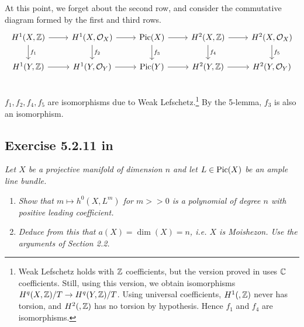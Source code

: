 \documentclass{article}
\begin{document}
At this point, we forget about the second row, and consider the commutative diagram formed by the first and third rows.
\[
\begin{tikzcd}
H^1(X,\Z)\arrow{r}\arrow{d}{f_1} & H^1(X,\mathcal{O}_X)\arrow{r}\arrow{d}{f_2} & \Pic(X) \arrow{r}\arrow{d}{f_3} & 
H^2(X,\Z)\arrow{r}\arrow{d}{f_4} & H^2(X,\mathcal{O}_X)\arrow{d}{f_5} \\
H^1(Y,\Z)\arrow{r} & H^1(Y,\mathcal{O}_Y)\arrow{r} & \Pic(Y) \arrow{r} & H^2(Y,\Z)\arrow{r} & H^2(Y,\mathcal{O}_Y) \\
\end{tikzcd}
\]
$f_1, f_2, f_4, f_5$ are isomorphisms due to Weak Lefschetz.\footnote{Weak Lefschetz holds with $\mathbb{Z}$ coefficients, but
the version proved in \cite{Huy} uses $\mathbb{C}$ coefficients. Still, using this version, we obtain isomorphisms
$H^q(X,\mathbb{Z})/T \to H^q(Y,\mathbb{Z})/T$. Using universal coefficients, $H^1( , \mathbb{Z})$ never has torsion, and $H^2( , \mathbb{Z})$ has no
torsion by hypothesis. Hence $f_1$ and $f_4$ are isomorphisms.} By the 5-lemma, $f_3$ is also an isomorphism.


\subsection*{Exercise 5.2.11 in \cite{Huy}}
\emph{Let $X$ be a projective manifold of dimension $n$ and let $L \in \operatorname{Pic}(X)$ be an
ample line bundle.}
\begin{enumerate}
\item \emph{Show that $m \mapsto h^0(X,L^m)$ for $m >>0$ is a polynomial of degree $n$ with
positive leading coefficient.}
\item \emph{Deduce from this that $a(X) = \dim(X) = n$, i.e. $X$ is Moishezon. Use the
arguments of Section 2.2.}
\end{enumerate}
\vspace{3mm}
\end{document}
